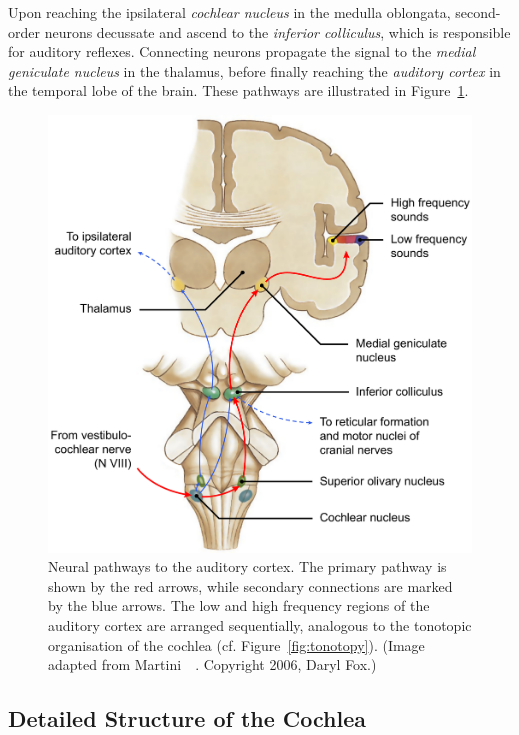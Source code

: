 Upon reaching the ipsilateral \emph{cochlear nucleus} in the medulla oblongata,
second-order neurons decussate and ascend to the \emph{inferior colliculus},
which is responsible for auditory reflexes. Connecting neurons propagate the
signal to the \emph{medial geniculate nucleus} in the thalamus, before finally
reaching the \emph{auditory cortex} in the temporal lobe of the brain. These
pathways are illustrated in Figure~\ref{fig:auditory_cortex}.

\begin{figure}
	\centering
	\includegraphics[width=12cm]{Background/cortex_labelled.pdf}
	\caption[Neural pathways to the auditory cortex]{Neural pathways to the
	auditory cortex. The primary pathway is shown by the red arrows, while
	secondary connections are marked by the blue arrows. The low and high
	frequency regions of the auditory cortex are arranged sequentially, analogous
	to the tonotopic organisation of the cochlea (cf. Figure~\ref{fig:tonotopy}).
	(Image adapted from Martini~\etal~\cite{martini2006}. Copyright
	\textcopyright{} 2006, Daryl Fox.)}
	\label{fig:auditory_cortex}
\end{figure}


\subsection{Detailed Structure of the Cochlea}
\label{section:cochlea_detail}


